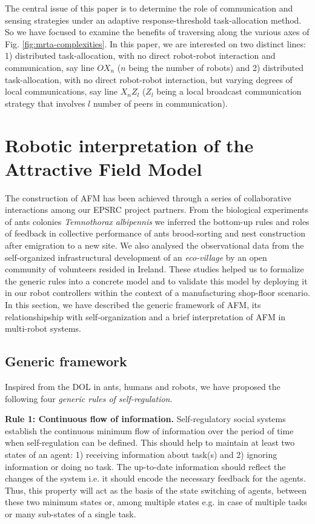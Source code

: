 \documentclass[final,5p,times,twocolumn]{elsarticle}
\begin{document}
The central issue of this paper is to determine the role of communication and sensing strategies under an adaptive response-threshold task-allocation method. So we have focused to examine the benefits of traversing along the various axes of Fig. \ref{fig:mrta-complexities}. In this paper, we are interested on two distinct lines: 1) distributed task-allocation, with no direct robot-robot interaction and communication, say line $OX_{n}$ ($n$ being the number of robots)  and 2) distributed task-allocation, with no direct robot-robot interaction, but varying degrees of local communications, say line $X_{n}Z_{l}$  ($Z_{l}$ being a local broadcast communication strategy that involves $l$ number of peers in communication).
\section{Robotic interpretation of the Attractive Field Model}
\label{sec:afm}
The construction of AFM has been achieved through a series of collaborative interactions among our EPSRC project partners. From the biological experiments of ants colonies {\em Temnothorax albipennis} we  inferred the bottom-up rules and roles of feedback in collective performance of ants brood-sorting and nest construction after emigration to a new site. We  also analysed the observational data from the self-organized infrastructural development of an {\em eco-village} by an open community of volunteers resided in Ireland. These studies helped us to formalize the generic rules into a concrete model  and to validate this model by deploying it in our robot controllers within the context of a manufacturing shop-floor scenario. In this section, we have described the generic framework of AFM, its relationshipship with self-organization and a brief interpretation of AFM in multi-robot systems.
\subsection{Generic framework}
\label{afm:framework}
Inspired from the DOL in ants, humans and robots,  we  have proposed the following four {\em generic rules of self-regulation}.

\textbf{Rule 1: Continuous flow of information.} Self-regulatory social systems establish the continuous minimum flow of information over the period of time when self-regulation can be defined. This should help to maintain at least two states of an agent: 1) receiving information about task(s) and 2) ignoring information or doing no task. The up-to-date information should reflect  the changes of the system i.e. it should encode the necessary feedback for the agents. Thus, this property will act as the basis of the state switching of agents, between these two minimum states or, among multiple states e.g. in case of multiple tasks or many sub-states of a single task.
\end{document}

